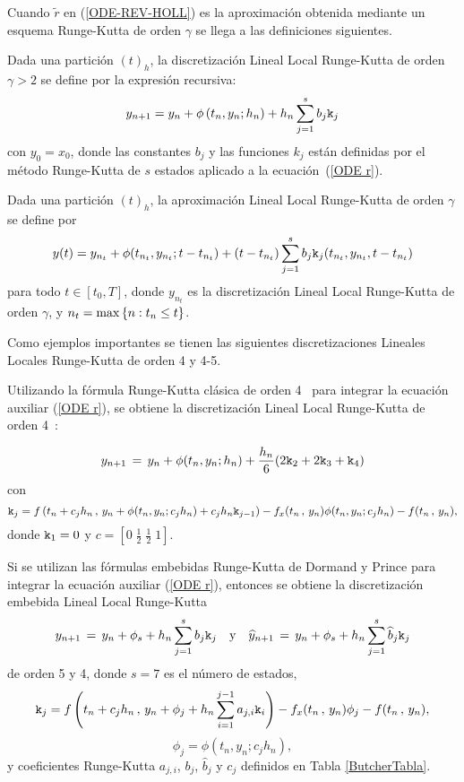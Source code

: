 Cuando $\widetilde{r}$ en (\ref{ODE-REV-HOLL})  es la aproximación obtenida mediante un esquema Runge-Kutta de orden $\gamma$ se llega a las definiciones siguientes.
\begin{definition}
	\label{definition HLLD} \cite{Jimenez13} Dada una partición $(t)_{h}$, la discretización Lineal Local Runge-Kutta 
    de orden $\gamma >2$ se define por la expresión recursiva:
	\begin{equation*}
	y_{n+1}=y_{n}+\phi \left( t_{n},y_{n};h_{n}\right) +h_{n}\sum_{j=1}^{s}b_{j}\mathtt{k}_{j}
	\end{equation*}%
	con $y_{0}=x_{0}$, donde las constantes $b_{j}$ y las funciones $k_{j}$ están definidas por el método Runge-Kutta de $s$ estados aplicado a la ecuación~(\ref{ODE r}).
\end{definition}

\begin{definition}
	\label{definition HOLLA} \cite{Jimenez13} Dada una partición $(t)_{h}$, la aproximación Lineal Local Runge-Kutta de orden $\gamma$ se define por 
	\begin{equation*}
	y(t)=y_{n_{t}}+\phi(t_{n_{t}},y_{n_{t}};t-t_{n_{t}})+(t-t_{n_{t}})%
	\sum_{j=1}^{s}b_{j}\kt_{j}(t_{n_{t}},y_{n_{t}},t-t_{n_{t}}) %
	\end{equation*}
	para todo $t\in[t_{0},T]$, donde $y_{n_{t}}$ es la discretización Lineal Local Runge-Kutta de orden $\gamma$, y $n_{t}=\max\left\{ n:t_{n}\leq t \right\}$.
\end{definition}

Como ejemplos importantes se tienen las siguientes discretizaciones Lineales Locales Runge-Kutta de orden 4 y 4-5.

Utilizando la fórmula Runge-Kutta clásica de orden 4~\cite{hairer1993solving} para integrar la ecuación auxiliar (\ref{ODE r}), se obtiene la discretización Lineal Local Runge-Kutta de orden 4~\cite{Jimenez13}:

\begin{equation}
    y_{n+1}\,=\,y_n+\phi(t_n,y_n;h_n)+\frac{h_n}{6}(2\mathtt{k}_2+2\mathtt{k}_3+\mathtt{k}_4)
    \label{LL-scheme-4}
\end{equation}
con
    \[ \mathtt{k}_j = f\left( t_n+c_jh_n\, , \, y_n+\phi(t_n,y_n;c_jh_n)+c_jh_n\mathtt{k}_{j-1} \right)
- f_x(t_n\, , \, y_n)\phi(t_n,y_n;c_jh_n) - f(t_n\, ,\, y_n) ,\]
donde $\mathtt{k}_1=0$ y $c = \left[ 0 \; \frac{1}{2} \; \frac{1}{2} \; 1  \right]$.

Si se utilizan las fórmulas embebidas Runge-Kutta de Dormand y Prince para integrar la ecuación auxiliar (\ref{ODE r}), entonces se obtiene la discretización embebida Lineal Local Runge-Kutta~\cite{Jimenez14AMC}
\begin{equation}
y_{n+1}\,=\,y_n+\phi_s+h_n \sum_{j=1}^{s}b_j \mathtt{k}_j \quad \text{y} \quad
\widehat{y}_{n+1}\,=\, y_n+\phi_s+h_n \sum_{j=1}^{s}\widehat{b}_j \mathtt{k}_j
\label{LLDP-scheme-dp}
\end{equation}
de orden 5 y 4, donde $s = 7$ es el número de estados,
\[ \mathtt{k}_j = f\left( t_n+c_jh_n\, , \, y_n+\phi_j+h_n \sum_{i=1}^{j-1}a_{j,i}\mathtt{k}_i \right)  
- f_x(t_n\, , \, y_n)\phi_j - f(t_n\, ,\, y_n),\]
\[ \phi _j = \phi \left( t_{n},y_{n};c_jh_{n}\right), \]
y coeficientes Runge-Kutta $a_{j,i}$, $b_j$, $\hat{b}_j$ y $c_j$ definidos en Tabla \ref{ButcherTabla}.


